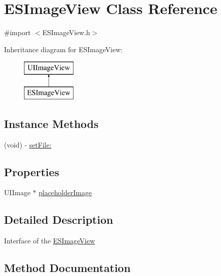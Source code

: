 \hypertarget{interface_e_s_image_view}{}\section{E\+S\+Image\+View Class Reference}
\label{interface_e_s_image_view}


{\ttfamily \#import $<$E\+S\+Image\+View.\+h$>$}

Inheritance diagram for E\+S\+Image\+View\+:\begin{figure}[H]
\begin{center}
\leavevmode
\includegraphics[height=2.000000cm]{interface_e_s_image_view}
\end{center}
\end{figure}
\subsection*{Instance Methods}
\begin{DoxyCompactItemize}
\item 
(void) -\/ \hyperlink{interface_e_s_image_view_a1d5b12bf01033be37c7881d7bd426169}{set\+File\+:}
\end{DoxyCompactItemize}
\subsection*{Properties}
\begin{DoxyCompactItemize}
\item 
U\+I\+Image $\ast$ \hyperlink{interface_e_s_image_view_aa1787ea7f754aa4a423cafe80df1ddd5}{placeholder\+Image}
\end{DoxyCompactItemize}


\subsection{Detailed Description}
Interface of the \hyperlink{interface_e_s_image_view}{E\+S\+Image\+View} 

\subsection{Method Documentation}
\hypertarget{interface_e_s_image_view_a1d5b12bf01033be37c7881d7bd426169}{}
